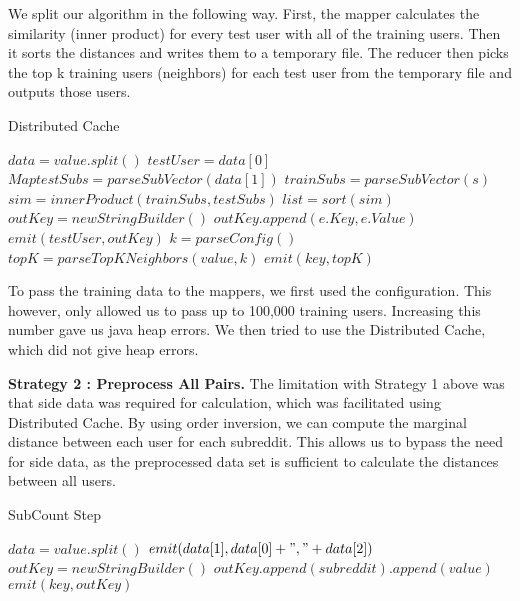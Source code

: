 \documentclass[conference, 12pt]{IEEEtran}
\begin{document}
We split our algorithm in the following way. First, the mapper calculates the similarity (inner product) for every test user with all of the training users. Then it sorts the distances and writes them to a temporary file. The reducer then picks the top k training users (neighbors) for each test user from the temporary file and outputs those users.
\begin{algorithm}[!h]
	\small
	\caption{Distributed Cache}
	\label{algo:disCache}
	\begin{algorithmic}[1]
			\State $data = value.split() $
			\State $testUser = data[0] $
			\State $Map testSubs = parseSubVector(data[1])$
				\State $trainSubs = parseSubVector(s)$
				\State $sim = innerProduct(trainSubs, testSubs)$
			\EndFor
			\State $list = sort(sim)$
			\State $outKey = new StringBuilder()$
				\State $outKey.append(e.Key,e.Value)$
			\EndFor
			\State $emit(testUser, outKey)$
		\EndFunction
			\State $ k = parseConfig()$
			\State $topK = parseTopKNeighbors(value, k)$
			\State $emit(key, topK)$
		\EndFunction
	\end{algorithmic}
\end{algorithm}

To pass the training data to the mappers, we first used the configuration. This however, only allowed us to pass up to 100,000 training users. Increasing this number gave us java heap errors. We then tried to use the Distributed Cache, which did not give heap errors.

\textbf{Strategy 2 : Preprocess All Pairs.} The limitation with Strategy 1 above was that side data was required for calculation, which was facilitated using Distributed Cache.  By using order inversion, we can compute the marginal distance between each user for each subreddit. This allows us to bypass the need for side data, as the preprocessed data set is sufficient to calculate the distances between all users.
\begin{algorithm}[!h]
	\small
	\caption{SubCount Step}
	\label{algo:subcount_step}
	\begin{algorithmic}[1]
			\State $data = value.split() $
			\State $emit(data[1], data[0] + "," + data[2])$
		\EndFunction
			\State $outKey = new StringBuilder()$
				\State $outKey.append(subreddit).append(value)$
			\EndFor
			\State $emit(key, outKey)$
		\EndFunction
	\end{algorithmic}
\end{algorithm}
\end{document}
